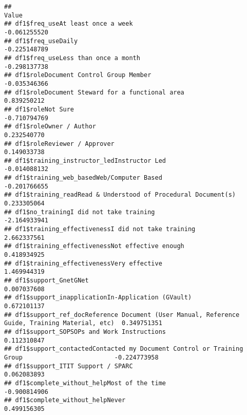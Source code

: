 \documentclass[]{article}
\begin{document}
\begin{verbatim}
##                                                                                                     Value
## df1$freq_useAt least once a week                                                             -0.061255520
## df1$freq_useDaily                                                                            -0.225148789
## df1$freq_useLess than once a month                                                           -0.298137738
## df1$roleDocument Control Group Member                                                        -0.035346366
## df1$roleDocument Steward for a functional area                                                0.839250212
## df1$roleNot Sure                                                                             -0.710794769
## df1$roleOwner / Author                                                                        0.232540770
## df1$roleReviewer / Approver                                                                   0.149033738
## df1$training_instructor_ledInstructor Led                                                    -0.014088132
## df1$training_web_basedWeb/Computer Based                                                     -0.201766655
## df1$training_readRead & Understood of Procedural Document(s)                                  0.233305064
## df1$no_trainingI did not take training                                                       -2.164933941
## df1$training_effectivenessI did not take training                                             2.662337561
## df1$training_effectivenessNot effective enough                                                0.418934925
## df1$training_effectivenessVery effective                                                      1.469944319
## df1$support_GnetGNet                                                                          0.007037608
## df1$support_inapplicationIn-Application (GVault)                                              0.672101137
## df1$support_ref_docReference Document (User Manual, Reference Guide, Training Material, etc)  0.349751351
## df1$support_SOPSOPs and Work Instructions                                                     0.112310847
## df1$support_contactedContacted my Document Control or Training Group                         -0.224773958
## df1$support_ITIT Support / SPARC                                                              0.062083893
## df1$complete_without_helpMost of the time                                                    -0.900814906
## df1$complete_without_helpNever                                                                0.499156305

\end{verbatim}
\end{document}
